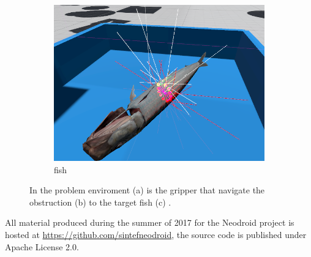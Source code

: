\begin{figure}
\begin{subfigure}[t]{0.33\textwidth}
\label{fig:obstructions-sim}
\end{subfigure}%
    \hfill
\begin{subfigure}[t]{0.33\textwidth}
\centering
\includegraphics[width=\linewidth]{figures/target}
\caption{fish}
\label{fig:fish-sim}
\end{subfigure}%

\caption{In the problem enviroment 
(a) %
is the gripper that navigate the obstruction 
(b) %
to the target fish 
(c)%
.}
\label{fig:problem-environment}
\end{figure}

All material produced during the summer of 2017 for the Neodroid project is hosted at \url{https://github.com/sintefneodroid}, the source code is published under Apache License 2.0.